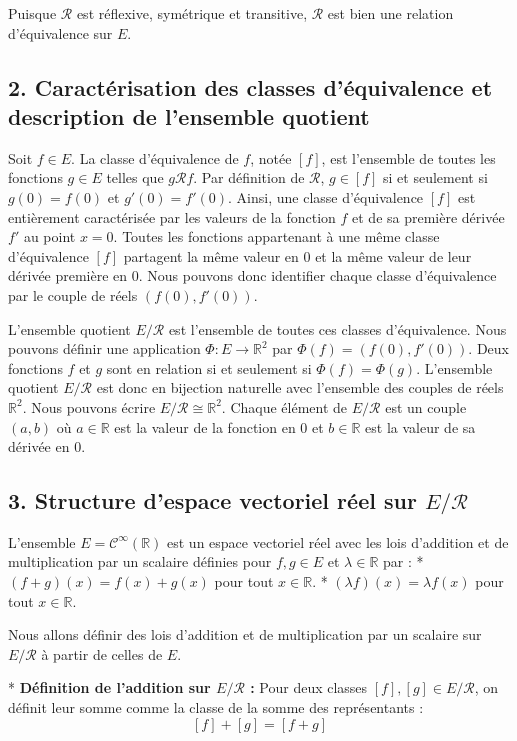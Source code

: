 \documentclass{report}
\begin{document}
Puisque $\mathcal{R}$ est réflexive, symétrique et transitive, $\mathcal{R}$ est bien une relation d'équivalence sur $E$.

\subsection*{2. Caractérisation des classes d'équivalence et description de l'ensemble quotient}

Soit $f \in E$. La classe d'équivalence de $f$, notée $[f]$, est l'ensemble de toutes les fonctions $g \in E$ telles que $g \mathcal{R} f$.
Par définition de $\mathcal{R}$, $g \in [f]$ si et seulement si $g(0) = f(0)$ et $g'(0) = f'(0)$.
Ainsi, une classe d'équivalence $[f]$ est entièrement caractérisée par les valeurs de la fonction $f$ et de sa première dérivée $f'$ au point $x=0$.
Toutes les fonctions appartenant à une même classe d'équivalence $[f]$ partagent la même valeur en $0$ et la même valeur de leur dérivée première en $0$.
Nous pouvons donc identifier chaque classe d'équivalence par le couple de réels $(f(0), f'(0))$.

L'ensemble quotient $E/\mathcal{R}$ est l'ensemble de toutes ces classes d'équivalence.
Nous pouvons définir une application $\Phi : E \to \mathbb{R}^2$ par $\Phi(f) = (f(0), f'(0))$.
Deux fonctions $f$ et $g$ sont en relation si et seulement si $\Phi(f) = \Phi(g)$.
L'ensemble quotient $E/\mathcal{R}$ est donc en bijection naturelle avec l'ensemble des couples de réels $\mathbb{R}^2$.
Nous pouvons écrire $E/\mathcal{R} \cong \mathbb{R}^2$. Chaque élément de $E/\mathcal{R}$ est un couple $(a,b)$ où $a \in \mathbb{R}$ est la valeur de la fonction en 0 et $b \in \mathbb{R}$ est la valeur de sa dérivée en 0.

\subsection*{3. Structure d'espace vectoriel réel sur $E/\mathcal{R}$}

L'ensemble $E = \mathcal{C}^\infty(\mathbb{R})$ est un espace vectoriel réel avec les lois d'addition et de multiplication par un scalaire définies pour $f, g \in E$ et $\lambda \in \mathbb{R}$ par :
*   $(f+g)(x) = f(x) + g(x)$ pour tout $x \in \mathbb{R}$.
*   $(\lambda f)(x) = \lambda f(x)$ pour tout $x \in \mathbb{R}$.

Nous allons définir des lois d'addition et de multiplication par un scalaire sur $E/\mathcal{R}$ à partir de celles de $E$.

*   \textbf{Définition de l'addition sur $E/\mathcal{R}$ :}
    Pour deux classes $[f], [g] \in E/\mathcal{R}$, on définit leur somme comme la classe de la somme des représentants :
    $$[f] + [g] = [f+g]$$
\end{document}
